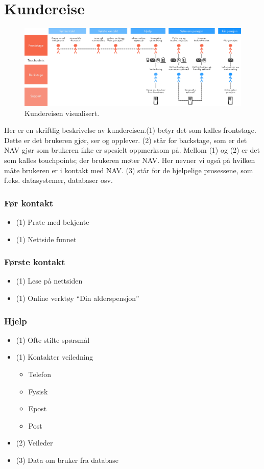 \documentclass[informationsecurity]{gucmasterproject}
\begin{document}
\newpage
\section{Kundereise}

\begin{figure}[h!]
	\centering
	\includegraphics[width=59em, angle=270]{kundereise}
	\caption{Kundereisen visualisert.}
	\label{fig:kundereise}
\end{figure}

Her er en skriftlig beskrivelse av kundereisen.(1) betyr det som kalles frontstage. Dette er det brukeren gjør, ser og opplever. (2) står for backstage, som er det NAV gjør som brukeren ikke er spesielt oppmerksom på. Mellom (1) og (2) er det som kalles touchpoints; der brukeren møter NAV. Her nevner vi også på hvilken måte brukeren er i kontakt med NAV. (3) står for de hjelpelige prosessene, som f.eks. datasystemer, databaser osv.

\subsubsection{Før kontakt}
\begin{itemize}
\item (1) Prate med bekjente
\item (1) Nettside funnet
\end{itemize}

\subsubsection{Første kontakt}
\begin{itemize}
\item (1) Lese på nettsiden
\item (1) Online verktøy “Din alderspensjon”
\end{itemize}

\subsubsection{Hjelp}
\begin{itemize}
\item (1) Ofte stilte spørsmål
\item (1) Kontakter veiledning
	\begin{itemize}
	\item Telefon
	\item Fysisk
	\item Epost
	\item Post
	\end{itemize}
\item (2) Veileder
\item (3) Data om bruker fra database
\end{itemize}
\end{document}

